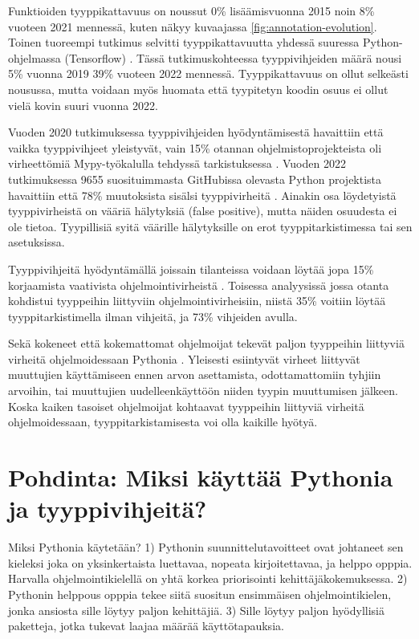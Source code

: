 \begin{otherlanguage}{finnish}
Funktioiden tyyppikattavuus on noussut 0\% lisäämisvuonna 2015 noin 8\% vuoteen 2021 mennessä, kuten näkyy kuvaajassa \ref{fig:annotation-evolution}. Toinen tuoreempi tutkimus selvitti tyyppikattavuutta yhdessä suuressa Python-ohjelmassa (Tensorflow) \cite{lin_towards_large_scale_2023}. Tässä tutkimuskohteessa tyyppivihjeiden määrä nousi 5\% vuonna 2019 39\% vuoteen 2022 mennessä. Tyyppikattavuus on ollut selkeästi nousussa, mutta voidaan myös huomata että tyypitetyn koodin osuus ei ollut vielä kovin suuri vuonna 2022.

Vuoden 2020 tutkimuksessa tyyppivihjeiden hyödyntämisestä havaittiin että vaikka tyyppivihjeet yleistyvät, vain 15\% otannan ohjelmistoprojekteista oli virheettömiä Mypy-työkalulla tehdyssä tarkistuksessa \cite{rak-amnouykit_taleoftwo_2020}. Vuoden 2022 tutkimuksessa 9655 suosituimmasta GitHubissa olevasta Python projektista havaittiin että 78\% muutoksista sisälsi tyyppivirheitä \cite{di_grazia_evolution_2022}. Ainakin osa löydetyistä tyyppivirheistä on vääriä hälytyksiä (false positive), mutta näiden osuudesta ei ole tietoa. Tyypillisiä syitä väärille hälytyksille on erot tyyppitarkistimessa tai sen asetuksissa.

Tyyppivihjeitä hyödyntämällä joissain tilanteissa voidaan löytää jopa 15\% korjaamista vaativista ohjelmointivirheistä \cite{khan_empirical_2022}. Toisessa analyysissä jossa otanta kohdistui tyyppeihin liittyviin ohjelmointivirheisiin, niistä 35\% voitiin löytää tyyppitarkistimella ilman vihjeitä, ja 73\% vihjeiden avulla.

Sekä kokeneet että kokemattomat ohjelmoijat tekevät paljon tyyppeihin liittyviä virheitä ohjelmoidessaan Pythonia \cite{khan_empirical_2022}. Yleisesti esiintyvät virheet liittyvät muuttujien käyttämiseen ennen arvon asettamista, odottamattomiin tyhjiin arvoihin, tai muuttujien uudelleenkäyttöön niiden tyypin muuttumisen jälkeen. Koska kaiken tasoiset ohjelmoijat kohtaavat tyyppeihin liittyviä virheitä ohjelmoidessaan, tyyppitarkistamisesta voi olla kaikille hyötyä.

\section*{Pohdinta: Miksi käyttää Pythonia ja tyyppivihjeitä?}
Miksi Pythonia käytetään? 1) Pythonin suunnittelutavoitteet ovat johtaneet sen kieleksi joka on yksinkertaista luettavaa, nopeata kirjoitettavaa, ja helppo opppia. Harvalla ohjelmointikielellä on yhtä korkea priorisointi kehittäjäkokemuksessa. 2) Pythonin helppous opppia tekee siitä suositun ensimmäisen ohjelmointikielen, jonka ansiosta sille löytyy paljon kehittäjiä. 3) Sille löytyy paljon hyödyllisiä paketteja, jotka tukevat laajaa määrää käyttötapauksia.


\end{otherlanguage}
